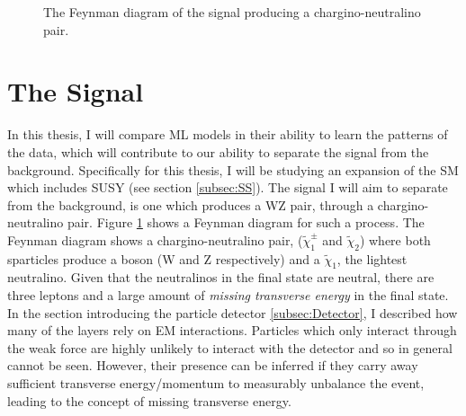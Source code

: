 \begin{figure}[H]
    \centering
    \caption{The Feynman diagram of the signal producing a chargino-neutralino pair.}
    \label{fig:signal}
\end{figure}
\section{The Signal}\label{sec:signal}
In this thesis, I will compare \ac{ML} models in their ability to learn the patterns of the data, which will contribute  
to our ability to separate the signal from the background. Specifically for this thesis, I will be studying an expansion of the 
\ac{SM} which includes \ac{SUSY} (see section \ref{subsec:SS}). The signal I will aim to separate from the background, is one 
which produces a WZ pair, through a chargino-neutralino pair. Figure \ref{fig:signal} shows a Feynman diagram for 
such a process. The Feynman diagram shows a chargino-neutralino pair, ($\tilde{\chi}_1^\pm$ and $\tilde{\chi}_2$)
where both sparticles produce a boson (W and Z respectively) and a $\tilde{\chi}_1$, the lightest neutralino. Given that the 
neutralinos in the final state are neutral, there are three leptons and a large amount of \emph{missing transverse energy} in the final state.
In the section introducing the particle detector \ref{subsec:Detector}, I described how many of the layers rely on \ac{EM} interactions. 
Particles which only interact through the weak force are highly unlikely to interact with the detector and so in general cannot be seen. 
However, their presence can be inferred if they carry away sufficient transverse energy/momentum to measurably unbalance the event, leading to the concept of 
missing transverse energy.
